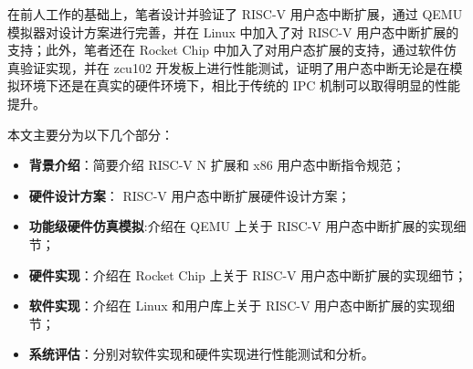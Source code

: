 在前人工作的基础上，笔者设计并验证了 RISC-V 用户态中断扩展，通过 QEMU 模拟器对设计方案进行完善，并在 Linux 中加入了对 RISC-V 用户态中断扩展的支持；此外，笔者还在 Rocket Chip 中加入了对用户态扩展的支持，通过软件仿真验证实现，并在 zcu102 开发板上进行性能测试，证明了用户态中断无论是在模拟环境下还是在真实的硬件环境下，相比于传统的 IPC 机制可以取得明显的性能提升。

本文主要分为以下几个部分：

\begin{itemize}
    \item \textbf{背景介绍}：简要介绍 RISC-V N 扩展和 x86 用户态中断指令规范；
    \item \textbf{硬件设计方案}： RISC-V 用户态中断扩展硬件设计方案；
    \item \textbf{功能级硬件仿真模拟}:介绍在 QEMU 上关于 RISC-V 用户态中断扩展的实现细节；
    \item \textbf{硬件实现}：介绍在 Rocket Chip 上关于 RISC-V 用户态中断扩展的实现细节；
    \item \textbf{软件实现}：介绍在 Linux 和用户库上关于 RISC-V 用户态中断扩展的实现细节；
    \item \textbf{系统评估}：分别对软件实现和硬件实现进行性能测试和分析。
\end{itemize}